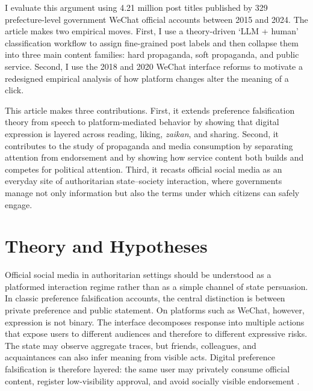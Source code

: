 \documentclass[12pt, american]{article}
\begin{document}
\begin{refsection}
I evaluate this argument using 4.21 million post titles published by 329 prefecture-level government WeChat official accounts between 2015 and 2024. The article makes two empirical moves. First, I use a theory-driven `LLM + human' classification workflow to assign fine-grained post labels and then collapse them into three main content families: hard propaganda, soft propaganda, and public service. Second, I use the 2018 and 2020 WeChat interface reforms to motivate a redesigned empirical analysis of how platform changes alter the meaning of a click.

This article makes three contributions. First, it extends preference falsification theory from speech to platform-mediated behavior by showing that digital expression is layered across reading, liking, \textit{zaikan}, and sharing. Second, it contributes to the study of propaganda and media consumption by separating attention from endorsement and by showing how service content both builds and competes for political attention. Third, it recasts official social media as an everyday site of authoritarian state--society interaction, where governments manage not only information but also the terms under which citizens can safely engage.

\section{Theory and Hypotheses}

Official social media in authoritarian settings should be understood as a platformed interaction regime rather than as a simple channel of state persuasion. In classic preference falsification accounts, the central distinction is between private preference and public statement. On platforms such as WeChat, however, expression is not binary. The interface decomposes response into multiple actions that expose users to different audiences and therefore to different expressive risks. The state may observe aggregate traces, but friends, colleagues, and acquaintances can also infer meaning from visible acts. Digital preference falsification is therefore layered: the same user may privately consume official content, register low-visibility approval, and avoid socially visible endorsement \parencite{Kuran1995,NoelleNeumann1993,ShenTruex2020,TsaiMen2018,Xu2022WeChat}.


\end{refsection}
\end{document}
